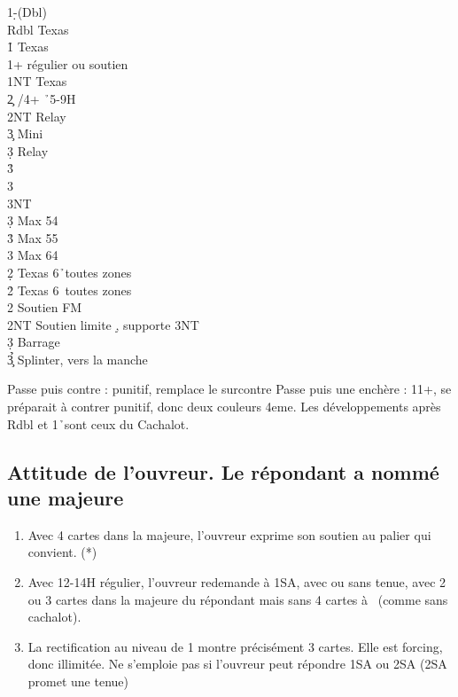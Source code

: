 \documentclass[a4paper]{article}
\begin{document}
\begin{bidtable}
1\d-(Dbl)\\
Rdbl \> Texas \h \\
1\h \> Texas \s \\
1\s {}+ régulier ou soutien \d \\
1NT \> Texas \c \\
2\c {} \s /4+ \h\ 5-9H\+\\
2NT \> Relay\+\\
3\c \> Mini\+\\
3\d \> Relay\+\\
3\h {}\\
3\s {}\\
3NT \-\-\\
3\d \> Max 54\\
3\h \> Max 55\\
3\s \> Max 64\-\-\\
2\d \> Texas 6\h\ toutes zones\\
2\h \> Texas 6\s\ toutes zones\\
2\s \> Soutien FM \d \\
2NT \> Soutien limite \d , supporte 3NT\\
3\d \> Barrage \d \\
3\c\h\s \> Splinter, vers la manche
\end{bidtable}

Passe puis contre : punitif, remplace le surcontre
Passe puis une enchère : 11+, se préparait à contrer punitif, donc deux couleurs 4eme.
Les développements après Rdbl et 1\h\ sont ceux du Cachalot.

\subsection{Attitude de l’ouvreur. Le répondant a 
nommé une majeure}

\begin{enumerate}
\item Avec 4 cartes dans la majeure, l’ouvreur exprime son soutien 
au palier qui convient. (*)

\item Avec 12-14H régulier, l’ouvreur redemande à 1SA, avec ou 
sans tenue, avec 2 ou 3 cartes dans la majeure du répondant 
mais sans 4 cartes à \s\ (comme sans cachalot).

\item La rectification au niveau de 1 montre précisément 3 cartes. 
Elle est forcing, donc illimitée. Ne s’emploie pas si l’ouvreur 
peut répondre 1SA ou 2SA (2SA promet une tenue)

\end{enumerate}
\end{document}
